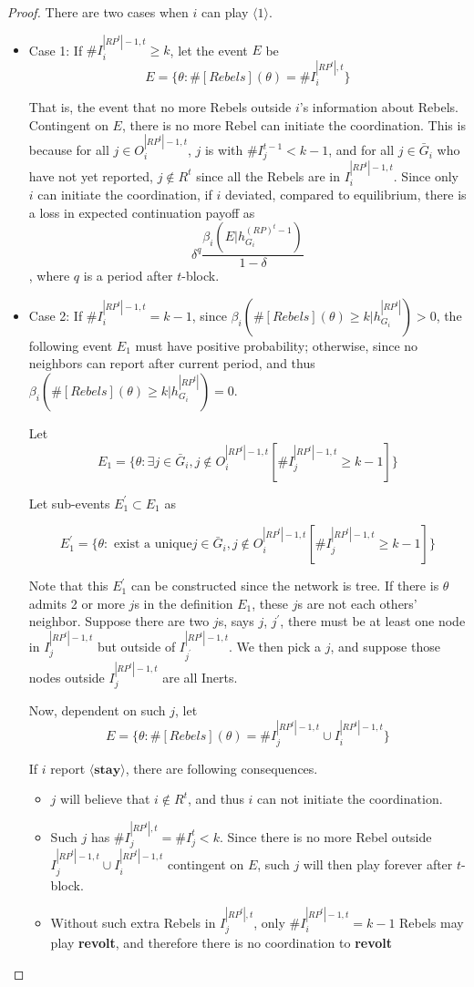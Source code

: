 \documentclass[12pt,letter]{article}
\theoremstyle{definition}
\theoremstyle{remark}
\theoremstyle{claim}
\begin{document}
\begin{proof}

There are two cases when $i$ can play $\langle 1 \rangle$.
\begin{itemize}

\item Case 1: If $\#I^{|RP^t|-1,t}_i\geq k$, let the event $E$ be
\[E=\{\theta: \#[Rebels](\theta)=\# I^{|RP^t|,t}_i\}\]

That is, the event that no more Rebels outside $i$'s information about Rebels. Contingent on $E$, there is no more Rebel can initiate the coordination. This is because for all $j\in O^{|RP^t|-1,t}_i$, $j$ is with $\# I^{t-1}_j< k-1$, and for all $j\in \bar{G}_i$ who have not yet reported, $j\not\in R^t$ since all the Rebels are in $I^{|RP^t|-1,t}_i$. Since only $i$ can initiate the coordination, if $i$ deviated, compared to equilibrium, there is a loss in expected continuation payoff as
\[\delta^q\frac{\beta_{i}(E|h^{(RP)^t-1}_{G_i})}{1-\delta}\], where $q$ is a period after $t$-block.

\item Case 2: If $\#I^{|RP^t|-1,t}_i= k-1$, since $\beta_{i}(\#[Rebels](\theta)\geq k|h^{|RP^t|}_{G_i})>0$, the following event $E_1$ must have positive probability; otherwise, since no neighbors can report after current period, and thus $\beta_{i}(\#[Rebels](\theta)\geq k|h^{|RP^t|}_{G_i})=0$.

Let
\[E_1=\{\theta: \exists j\in \bar{G}_i, j\notin O^{|RP^t|-1,t}_i [\#I^{|RP^t|-1,t}_j\geq k-1]\}\]


Let sub-events $E^{'}_1\subset E_1$ as

\[E^{'}_1=\{\theta: \text{ exist a unique} j\in \bar{G}_i, j\notin O^{|RP^t|-1,t}_i [\#I^{|RP^t|-1,t}_j\geq k-1]\}\] 

Note that this $E^{'}_1$ can be constructed since the network is tree. If there is $\theta$ admits 2 or more $j$s in the definition $E_1$, these $j$s are not each others' neighbor. Suppose there are two $j$s, says $j$, $j^{'}$, there must be at least one node in $I^{|RP^t|-1,t}_j$ but outside of $I^{|RP^t|-1,t}_{j^{'}}$. We then pick a $j$, and suppose those nodes outside $I^{|RP^t|-1,t}_j$ are all Inerts.

Now, dependent on such $j$, let
\[E=\{\theta:\#[Rebels](\theta)=\#I^{|RP^t|-1,t}_j\cup I^{|RP^t|-1,t}_i\}\]

If $i$ report $\langle \textbf{stay} \rangle$, there are following consequences.

\begin{itemize}
\item $j$ will believe that $i\notin R^t$, and thus $i$ can not initiate the coordination.
\item Such $j$ has $\#I^{|RP^t|,t}_j=\#I^t_j<k$. Since there is no more Rebel outside $I^{|RP^t|-1,t}_j\cup I^{|RP^t|-1,t}_i$ contingent on $E$, such $j$ will then play  forever after $t$-block.
\item Without such extra Rebels in $I^{|RP^t|,t}_j$, only $\#I^{|RP^t|-1,t}_i= k-1$ Rebels may play \textbf{revolt}, and therefore there is no coordination to \textbf{revolt}
\end{itemize}


\end{itemize}
\end{proof}
\end{document}
